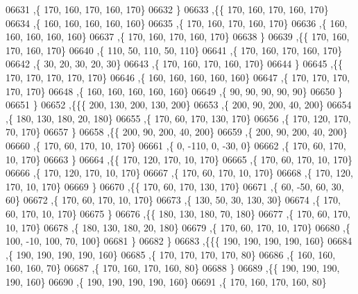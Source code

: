 \begin{DoxyCode}
06631     ,\{   170,   160,   170,   160,   170\}
06632     \}
06633    ,\{\{   170,   160,   170,   160,   170\}
06634     ,\{   160,   160,   160,   160,   160\}
06635     ,\{   170,   160,   170,   160,   170\}
06636     ,\{   160,   160,   160,   160,   160\}
06637     ,\{   170,   160,   170,   160,   170\}
06638     \}
06639    ,\{\{   170,   160,   170,   160,   170\}
06640     ,\{   110,    50,   110,    50,   110\}
06641     ,\{   170,   160,   170,   160,   170\}
06642     ,\{    30,    20,    30,    20,    30\}
06643     ,\{   170,   160,   170,   160,   170\}
06644     \}
06645    ,\{\{   170,   170,   170,   170,   170\}
06646     ,\{   160,   160,   160,   160,   160\}
06647     ,\{   170,   170,   170,   170,   170\}
06648     ,\{   160,   160,   160,   160,   160\}
06649     ,\{    90,    90,    90,    90,    90\}
06650     \}
06651    \}
06652   ,\{\{\{   200,   130,   200,   130,   200\}
06653     ,\{   200,    90,   200,    40,   200\}
06654     ,\{   180,   130,   180,    20,   180\}
06655     ,\{   170,    60,   170,   130,   170\}
06656     ,\{   170,   120,   170,    70,   170\}
06657     \}
06658    ,\{\{   200,    90,   200,    40,   200\}
06659     ,\{   200,    90,   200,    40,   200\}
06660     ,\{   170,    60,   170,    10,   170\}
06661     ,\{     0,  -110,     0,   -30,     0\}
06662     ,\{   170,    60,   170,    10,   170\}
06663     \}
06664    ,\{\{   170,   120,   170,    10,   170\}
06665     ,\{   170,    60,   170,    10,   170\}
06666     ,\{   170,   120,   170,    10,   170\}
06667     ,\{   170,    60,   170,    10,   170\}
06668     ,\{   170,   120,   170,    10,   170\}
06669     \}
06670    ,\{\{   170,    60,   170,   130,   170\}
06671     ,\{    60,   -50,    60,    30,    60\}
06672     ,\{   170,    60,   170,    10,   170\}
06673     ,\{   130,    50,    30,   130,    30\}
06674     ,\{   170,    60,   170,    10,   170\}
06675     \}
06676    ,\{\{   180,   130,   180,    70,   180\}
06677     ,\{   170,    60,   170,    10,   170\}
06678     ,\{   180,   130,   180,    20,   180\}
06679     ,\{   170,    60,   170,    10,   170\}
06680     ,\{   100,   -10,   100,    70,   100\}
06681     \}
06682    \}
06683   ,\{\{\{   190,   190,   190,   190,   160\}
06684     ,\{   190,   190,   190,   190,   160\}
06685     ,\{   170,   170,   170,   170,    80\}
06686     ,\{   160,   160,   160,   160,    70\}
06687     ,\{   170,   160,   170,   160,    80\}
06688     \}
06689    ,\{\{   190,   190,   190,   190,   160\}
06690     ,\{   190,   190,   190,   190,   160\}
06691     ,\{   170,   160,   170,   160,    80\}

\end{DoxyCode}
